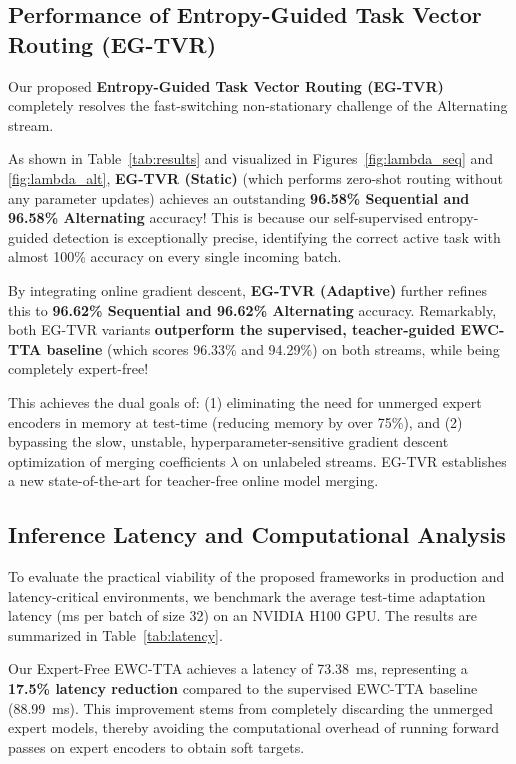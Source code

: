 \documentclass{article}
\theoremstyle{plain}
\theoremstyle{definition}
\theoremstyle{remark}
\begin{document}
\subsection{Performance of Entropy-Guided Task Vector Routing (EG-TVR)}
Our proposed \textbf{Entropy-Guided Task Vector Routing (EG-TVR)} completely resolves the fast-switching non-stationary challenge of the Alternating stream. 

As shown in Table~\ref{tab:results} and visualized in Figures~\ref{fig:lambda_seq} and \ref{fig:lambda_alt}, \textbf{EG-TVR (Static)} (which performs zero-shot routing without any parameter updates) achieves an outstanding \textbf{96.58\% Sequential and 96.58\% Alternating} accuracy! This is because our self-supervised entropy-guided detection is exceptionally precise, identifying the correct active task with almost 100\% accuracy on every single incoming batch. 

By integrating online gradient descent, \textbf{EG-TVR (Adaptive)} further refines this to \textbf{96.62\% Sequential and 96.62\% Alternating} accuracy. Remarkably, both EG-TVR variants \textbf{outperform the supervised, teacher-guided EWC-TTA baseline} (which scores 96.33\% and 94.29\%) on both streams, while being completely expert-free! 

This achieves the dual goals of: (1) eliminating the need for unmerged expert encoders in memory at test-time (reducing memory by over 75\%), and (2) bypassing the slow, unstable, hyperparameter-sensitive gradient descent optimization of merging coefficients $\lambda$ on unlabeled streams. EG-TVR establishes a new state-of-the-art for teacher-free online model merging.

\subsection{Inference Latency and Computational Analysis}
To evaluate the practical viability of the proposed frameworks in production and latency-critical environments, we benchmark the average test-time adaptation latency (ms per batch of size 32) on an NVIDIA H100 GPU. The results are summarized in Table~\ref{tab:latency}.

Our Expert-Free EWC-TTA achieves a latency of 73.38~ms, representing a \textbf{17.5\% latency reduction} compared to the supervised EWC-TTA baseline (88.99~ms). This improvement stems from completely discarding the unmerged expert models, thereby avoiding the computational overhead of running forward passes on expert encoders to obtain soft targets.
\end{document}
